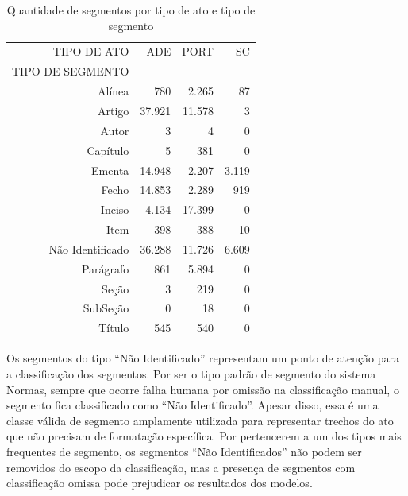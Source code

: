 \begin{table}[h] 
\caption{Quantidade de segmentos por tipo de ato e tipo de segmento}
\label{tab:segmentos-por-tipo}
	\begin{center} 

		\begin{tabular}{rrrr}
		\toprule
		TIPO DE ATO &      ADE    &   PORT &      SC \\
		TIPO DE SEGMENTO          &        &         \\
		\midrule
		Alínea           &    780 &  2.265 &      87 \\
		Artigo           & 37.921 & 11.578 &       3 \\
		Autor            &      3 &      4 &       0 \\
		Capítulo         &      5 &    381 &       0 \\
		Ementa           & 14.948 &  2.207 &   3.119 \\
		Fecho            & 14.853 &  2.289 &     919 \\
		Inciso           &  4.134 & 17.399 &       0 \\
		Item             &    398 &    388 &      10 \\
		Não Identificado & 36.288 & 11.726 &   6.609 \\
		Parágrafo        &    861 &  5.894 &       0 \\
		Seção            &      3 &    219 &       0 \\
		SubSeção         &      0 &     18 &       0 \\
		Título           &    545 &    540 &       0 \\
		\bottomrule
	\end{tabular}
	\end{center}
	\fdp
\end{table} 

Os segmentos do tipo ``Não Identificado'' representam um ponto de atenção para a classificação dos segmentos. Por ser o tipo padrão de segmento do sistema Normas, sempre que ocorre falha humana por omissão na classificação manual, o segmento fica classificado como ``Não Identificado''. Apesar disso, essa é uma classe válida de segmento amplamente utilizada para representar trechos do ato que não precisam de formatação específica. Por pertencerem a um dos tipos mais frequentes de segmento, os segmentos ``Não Identificados'' não podem ser removidos do escopo da classificação, mas a presença de segmentos com classificação omissa pode prejudicar os resultados dos modelos.

